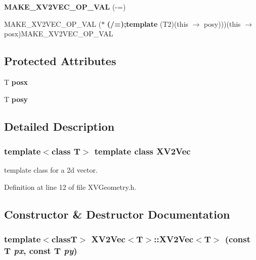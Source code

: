\begin{CompactItemize}
\item 
\label{XV2Vec_a16}
\hypertarget{class_XV2Vec_a16}{
{\bf MAKE\_\-XV2VEC\_\-OP\_\-VAL} (-=)}

\item 
\label{XV2Vec_a17}
\hypertarget{class_XV2Vec_a17}{
MAKE\_\-XV2VEC\_\-OP\_\-VAL ($\ast$ {\bf (/=);template} (T2)(this $\rightarrow$ posy)))(this $\rightarrow$ posx)MAKE\_\-XV2VEC\_\-OP\_\-VAL}

\end{CompactItemize}
\subsection*{Protected Attributes}
\begin{CompactItemize}
\item 
T {\bf posx}
\item 
T {\bf posy}
\end{CompactItemize}


\subsection{Detailed Description}
\subsubsection*{template$<$class T$>$  template class XV2Vec}

template class for a 2d vector.





Definition at line 12 of file XVGeometry.h.

\subsection{Constructor \& Destructor Documentation}
\label{XV2Vec_a4}
\hypertarget{class_XV2Vec_a4}{
\subsubsection[XV2Vec]{\setlength{\rightskip}{0pt plus 5cm}template$<$classT$>$ XV2Vec$<$T$>$::XV2Vec$<$T$>$ (const T {\em px}, const T {\em py})}}





